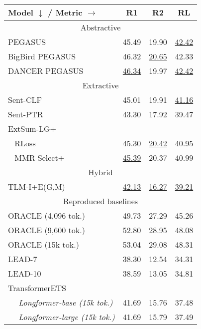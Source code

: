 \documentclass[11pt]{article}
\begin{document}
\begin{table}[ht]
\fontsize{9}{9}
\selectfont
\centering
\begin{tabular}[t]{@{}llll@{}}
\toprule
Model $\downarrow$ / Metric $\rightarrow$  & \multicolumn{1}{c}{R1} & \multicolumn{1}{c}{R2} & \multicolumn{1}{c}{RL} \\ \midrule
\multicolumn{4}{c}{Abstractive}               \\ \midrule
PEGASUS \citeyearpar{zhang2019pegasus}   & 45.49 & 19.90  & \underline{42.42} \\
BigBird PEGASUS \citeyearpar{bigbird}   & 46.32 & \underline{20.65} & 42.33 \\
DANCER PEGASUS \citeyearpar{dancer2020}   & \underline{46.34} & 19.97 & \underline{42.42} \\ \midrule
\multicolumn{4}{c}{Extractive}                \\ \midrule
Sent-CLF \citeyearpar{pilault-etal-2020-extractive}              & 45.01 & 19.91 & \underline{41.16} \\
Sent-PTR \citeyearpar{pilault-etal-2020-extractive}              & 43.30  & 17.92 & 39.47 \\
ExtSum-LG+ \citeyearpar{xiao-carenini-2020-systematically}   & & &\\
~ RLoss      & 45.30  & \underline{20.42} & 40.95 \\
~ MMR-Select+ & \underline{45.39} & 20.37 & 40.99 \\ \midrule
\multicolumn{4}{c}{Hybrid}                    \\ \midrule
TLM-I+E(G,M) \citeyearpar{pilault-etal-2020-extractive}       & \underline{42.13} & \underline{16.27} & \underline{39.21} \\ \midrule \multicolumn{4}{c}{Reproduced baselines}                           \\ \midrule
ORACLE (4,096 tok.)     & 49.73   & 27.29 & 45.26  \\
ORACLE (9,600 tok.)      & 52.80    & 28.95 & 48.08  \\
ORACLE (15k tok.)      & 53.04   & 29.08 & 48.31  \\
LEAD-7                       & 38.30    & 12.54 & 34.31  \\
LEAD-10                      & 38.59   & 13.05 & 34.81  \\
TransformerETS   & & & \\
~~ \textit{Longformer-base (15k tok.)}   & 41.69   & 15.76 & 37.48  \\
~~ \textit{Longformer-large (15k tok.)}  & 41.69   & 15.79 & 37.49  \\ \midrule

\end{tabular}
\end{table}
\end{document}

